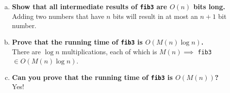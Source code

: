 \begin{problem}{0.4}
\begin{enumerate}[(a)]
    \item \textbf{Show that all intermediate results of \texttt{fib3} are $O(n)$ bits long.}
    \\
    Adding two numbers that have $n$ bits will result in at most an $n+1$ bit number.

    \item \textbf{Prove that the running time of \texttt{fib3} is $O(M(n)\log n)$.}
    \\
    There are $\log n$ multiplications, each of which is $M(n)\implies$ \texttt{fib3} $\in O(M(n)\log n)$.

    \item \textbf{Can you prove that the running time of \texttt{fib3} is $O(M(n))$?}
    \\
    Yes!
    \end{enumerate}
\end{problem}
